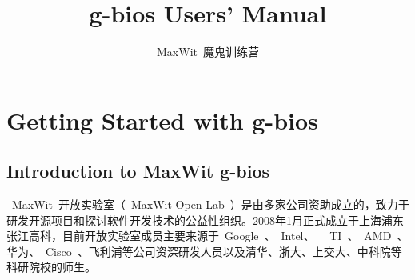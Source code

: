 \documentclass[a4paper,11pt]{book}
\title{g-bios Users' Manual}
\author{MaxWit~魔鬼训练营}
\begin{document}
\maketitle

\frontmatter
\tableofcontents

\mainmatter
\chapter{Getting Started with g-bios}

\section{Introduction to MaxWit g-bios}
~MaxWit~开放实验室（~MaxWit Open Lab~）是由多家公司资助成立的，致力于研发开源项目和探讨软件开发技术的公益性组织。2008年1月正式成立于上海浦东张江高科，目前开放实验室成员主要来源于~Google~、~Intel、~ ~TI~、~AMD~、华为、~Cisco~、飞利浦等公司资深研发人员以及清华、浙大、上交大、中科院等科研院校的师生。
\end{document}
